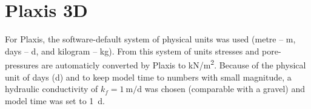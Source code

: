 

\section{Plaxis 3D}

For Plaxis, the software-default system of physical units was used (metre --
\unit{\metre}, days -- \unit{\day}, and kilogram -- \unit{\kilogram}). From
this system of units stresses and pore-pressures are automaticly converted by
Plaxis to \unit[per-mode = symbol]{\kilo\newton\per\square\metre}. Because of
the physical unit of days (\unit{\day}) and to keep model time to numbers with
small magnitude, a hydraulic conductivity of $k_f = \qty[per-mode =
        symbol]{1}{\metre\per\day}$ was chosen (comparable with a gravel) and model
time was set to \qty{1}{\day}.

